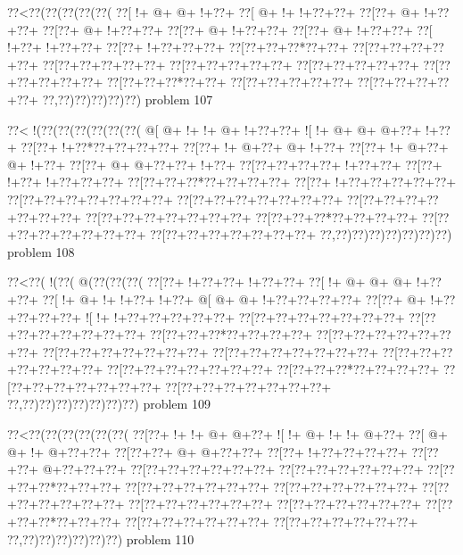 \vbox{\vbox{\goo
\0??<\0??(\0??(\0??(\0??(\0??(
\0??[\- !+\- @+\- @+\- !+\0??+
\0??[\- @+\- !+\- !+\0??+\0??+
\0??[\0??+\- @+\- !+\0??+\0??+
\0??[\0??+\- @+\- !+\0??+\0??+
\0??[\0??+\- @+\- !+\0??+\0??+
\0??[\0??+\- @+\- !+\0??+\0??+
\0??[\- !+\0??+\- !+\0??+\0??+
\0??[\0??+\- !+\0??+\0??+\0??+
\0??[\0??+\0??+\0??*\0??+\0??+
\0??[\0??+\0??+\0??+\0??+\0??+
\0??[\0??+\0??+\0??+\0??+\0??+
\0??[\0??+\0??+\0??+\0??+\0??+
\0??[\0??+\0??+\0??+\0??+\0??+
\0??[\0??+\0??+\0??+\0??+\0??+
\0??[\0??+\0??+\0??*\0??+\0??+
\0??[\0??+\0??+\0??+\0??+\0??+
\0??[\0??+\0??+\0??+\0??+\0??+
\0??,\0??)\0??)\0??)\0??)\0??)
}
\hfil problem 107\hfil\break
}

\vbox{\vbox{\goo
\0??<\- !(\0??(\0??(\0??(\0??(\0??(\0??(
\- @[\- @+\- !+\- !+\- @+\- !+\0??+\0??+
\- ![\- !+\- @+\- @+\- @+\0??+\- !+\0??+
\0??[\0??+\- !+\0??*\0??+\0??+\0??+\0??+
\0??[\0??+\- !+\- @+\0??+\- @+\- !+\0??+
\0??[\0??+\- !+\- @+\0??+\- @+\- !+\0??+
\0??[\0??+\- @+\- @+\0??+\0??+\- !+\0??+
\0??[\0??+\0??+\0??+\0??+\- !+\0??+\0??+
\0??[\0??+\- !+\0??+\- !+\0??+\0??+\0??+
\0??[\0??+\0??+\0??*\0??+\0??+\0??+\0??+
\0??[\0??+\- !+\0??+\0??+\0??+\0??+\0??+
\0??[\0??+\0??+\0??+\0??+\0??+\0??+\0??+
\0??[\0??+\0??+\0??+\0??+\0??+\0??+\0??+
\0??[\0??+\0??+\0??+\0??+\0??+\0??+\0??+
\0??[\0??+\0??+\0??+\0??+\0??+\0??+\0??+
\0??[\0??+\0??+\0??*\0??+\0??+\0??+\0??+
\0??[\0??+\0??+\0??+\0??+\0??+\0??+\0??+
\0??[\0??+\0??+\0??+\0??+\0??+\0??+\0??+
\0??,\0??)\0??)\0??)\0??)\0??)\0??)\0??)
}
\hfil problem 108\hfil\break
}

\vbox{\vbox{\goo
\0??<\0??(\- !(\0??(\- @(\0??(\0??(\0??(
\0??[\0??+\- !+\0??+\0??+\- !+\0??+\0??+
\0??[\- !+\- @+\- @+\- @+\- !+\0??+\0??+
\0??[\- !+\- @+\- !+\- !+\0??+\- !+\0??+
\- @[\- @+\- @+\- !+\0??+\0??+\0??+\0??+
\0??[\0??+\- @+\- !+\0??+\0??+\0??+\0??+
\- ![\- !+\- !+\0??+\0??+\0??+\0??+\0??+
\0??[\0??+\0??+\0??+\0??+\0??+\0??+\0??+
\0??[\0??+\0??+\0??+\0??+\0??+\0??+\0??+
\0??[\0??+\0??+\0??*\0??+\0??+\0??+\0??+
\0??[\0??+\0??+\0??+\0??+\0??+\0??+\0??+
\0??[\0??+\0??+\0??+\0??+\0??+\0??+\0??+
\0??[\0??+\0??+\0??+\0??+\0??+\0??+\0??+
\0??[\0??+\0??+\0??+\0??+\0??+\0??+\0??+
\0??[\0??+\0??+\0??+\0??+\0??+\0??+\0??+
\0??[\0??+\0??+\0??*\0??+\0??+\0??+\0??+
\0??[\0??+\0??+\0??+\0??+\0??+\0??+\0??+
\0??[\0??+\0??+\0??+\0??+\0??+\0??+\0??+
\0??,\0??)\0??)\0??)\0??)\0??)\0??)\0??)
}
\hfil problem 109\hfil\break
}

\vbox{\vbox{\goo
\0??<\0??(\0??(\0??(\0??(\0??(\0??(
\0??[\0??+\- !+\- !+\- @+\- @+\0??+
\- ![\- !+\- @+\- !+\- !+\- @+\0??+
\0??[\- @+\- @+\- !+\- @+\0??+\0??+
\0??[\0??+\0??+\- @+\- @+\0??+\0??+
\0??[\0??+\- !+\0??+\0??+\0??+\0??+
\0??[\0??+\0??+\- @+\0??+\0??+\0??+
\0??[\0??+\0??+\0??+\0??+\0??+\0??+
\0??[\0??+\0??+\0??+\0??+\0??+\0??+
\0??[\0??+\0??+\0??*\0??+\0??+\0??+
\0??[\0??+\0??+\0??+\0??+\0??+\0??+
\0??[\0??+\0??+\0??+\0??+\0??+\0??+
\0??[\0??+\0??+\0??+\0??+\0??+\0??+
\0??[\0??+\0??+\0??+\0??+\0??+\0??+
\0??[\0??+\0??+\0??+\0??+\0??+\0??+
\0??[\0??+\0??+\0??*\0??+\0??+\0??+
\0??[\0??+\0??+\0??+\0??+\0??+\0??+
\0??[\0??+\0??+\0??+\0??+\0??+\0??+
\0??,\0??)\0??)\0??)\0??)\0??)\0??)
}
\hfil problem 110\hfil\break
}

